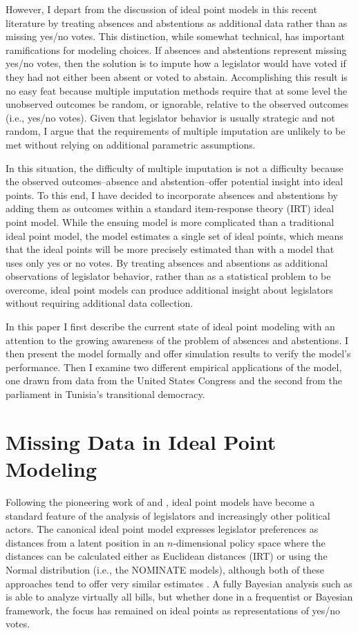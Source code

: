	However, I depart from the discussion of ideal point models in this recent literature by treating absences and abstentions as additional data rather than as missing yes/no votes. This distinction, while somewhat technical, has important ramifications for modeling choices. If absences and abstentions represent missing yes/no votes, then the solution is to impute how a legislator would have voted if they had not either been absent or voted to abstain. Accomplishing this result is no easy feat because multiple imputation methods require that at some level the unobserved outcomes be random, or ignorable, relative to the observed outcomes (i.e., yes/no votes). Given that legislator behavior is usually strategic and not random, I argue that the requirements of multiple imputation are unlikely to be met without relying on additional parametric assumptions. 
	
	In this situation, the difficulty of multiple imputation is not a difficulty because the observed outcomes--absence and abstention--offer potential insight into ideal points. To this end, I have decided to incorporate absences and abstentions by adding them as outcomes within a standard item-response theory (IRT) ideal point model. While the ensuing model is more complicated than a traditional ideal point model, the model estimates a single set of ideal points, which means that the ideal points will be more precisely estimated than with a model that uses only yes or no votes. By treating absences and absentions as additional observations of legislator behavior, rather than as a statistical problem to be overcome, ideal point models can produce additional insight about legislators without requiring additional data collection.
	
	In this paper I first describe the current state of ideal point modeling with an attention to the growing awareness of the problem of absences and abstentions. I then present the model formally and offer simulation results to verify the model's performance. Then I examine two different empirical applications of the model, one drawn from data from the United States Congress and the second from the parliament in Tunisia's transitional democracy.
	
	\section*{Missing Data in Ideal Point Modeling}
	
	Following the pioneering work of \textcite{poole1997} and \textcite{jackman2004}, ideal point models have become a standard feature of the analysis of legislators and increasingly other political actors. The canonical ideal point model expresses legislator preferences as distances from a latent position in an $n$-dimensional policy space \parencite{enelow198} where the distances can be calculated either as Euclidean distances (IRT) or using the Normal distribution (i.e., the NOMINATE models), although both of these approaches tend to offer very similar estimates  \parencite{carroll2009}. A fully Bayesian analysis such as \textcite{jackman2004} is able to analyze virtually all bills, but whether done in a frequentist or Bayesian framework, the focus has remained on ideal points as representations of yes/no votes.
	
